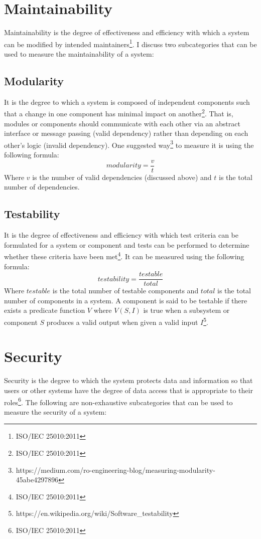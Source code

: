 \documentclass[11pt,a4paper]{article}
\def \iso{\footnote{ISO/IEC 25010:2011}}
\begin{document}
\section{Maintainability}
Maintainability is the degree of effectiveness and efficiency with which a system can be modified by intended
maintainers\iso. I discuss two subcategories that can be used to measure the maintainability of a system:

\subsection{Modularity}
It is the degree to which a system is composed of independent components such that a change in one component
has minimal impact on another\iso.
That is, modules or components should communicate with each other via an abstract interface or message passing
(valid dependency) rather than depending on each other's logic (invalid dependency).
One suggested way\footnote{https://medium.com/ro-engineering-blog/measuring-modularity-45abe4297896} to measure it
is using the following formula:
\[modularity = \frac{v}{t}\]
Where $v$ is the number of valid dependencies (discussed above) and $t$ is the total number of dependencies.

\subsection{Testability}
It is the degree of effectiveness and efficiency with which test criteria can be formulated for a system or component
and tests can be performed to determine whether these criteria have been met\iso.
It can be measured using the following formula:
\[testability = \frac{testable}{total}\]
Where $testable$ is the total number of testable components and $total$ is the total number of components in a system.
A component is said to be testable if there exists a predicate function $V$ where $V(S, I)$ is true
when a subsystem or component $S$ produces a valid output when given a valid input
$I$\footnote{https://en.wikipedia.org/wiki/Software\_testability}.

\section{Security}
Security is the degree to which the system protects data and information
so that users or other systems have the degree of data access that is appropriate to their roles\iso.
The following are non-exhaustive subcategories that can be used to measure the security of a system:
\end{document}
